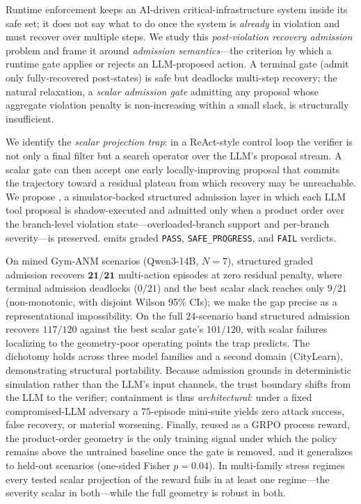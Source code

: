 Runtime enforcement keeps an AI-driven critical-infrastructure system inside its safe set; it does not say what to do once the system is \emph{already} in violation and must recover over multiple steps. We study this \emph{post-violation recovery admission} problem and frame it around \emph{admission semantics}---the criterion by which a runtime gate applies or rejects an LLM-proposed action. A terminal gate (admit only fully-recovered post-states) is safe but deadlocks multi-step recovery; the natural relaxation, a \emph{scalar admission gate} admitting any proposal whose aggregate violation penalty is non-increasing within a small slack, is structurally insufficient.

We identify the \emph{scalar projection trap}: in a ReAct-style control loop the verifier is not only a final filter but a search operator over the LLM's proposal stream. A scalar gate can then accept one early locally-improving proposal that commits the trajectory toward a residual plateau from which recovery may be unreachable. We propose \silr{}, a simulator-backed structured admission layer in which each LLM tool proposal is shadow-executed and admitted only when a product order over the branch-level violation state---overloaded-branch support and per-branch severity---is preserved. \silr{} emits graded \texttt{PASS}, \texttt{SAFE\_PROGRESS}, and \texttt{FAIL} verdicts.

On mined Gym-ANM scenarios (Qwen3-14B, $N{=}7$), structured graded admission recovers $\mathbf{21/21}$ multi-action episodes at zero residual penalty, where terminal admission deadlocks ($0/21$) and the best scalar slack reaches only $9/21$ (non-monotonic, with disjoint Wilson 95\% CIs); we make the gap precise as a representational impossibility. On the full $24$-scenario band structured admission recovers $117/120$ against the best scalar gate's $101/120$, with scalar failures localizing to the geometry-poor operating points the trap predicts. The dichotomy holds across three model families and a second domain (CityLearn), demonstrating structural portability. Because admission grounds in deterministic simulation rather than the LLM's input channels, the trust boundary shifts from the LLM to the verifier; containment is thus \emph{architectural}: under a fixed compromised-LLM adversary a $75$-episode mini-suite yields zero attack success, false recovery, or material worsening. Finally, reused as a GRPO process reward, the product-order geometry is the only training signal under which the policy remains above the untrained baseline once the gate is removed, and it generalizes to held-out scenarios (one-sided Fisher $p{=}0.04$). In multi-family stress regimes every tested scalar projection of the reward fails in at least one regime---the severity scalar in both---while the full geometry is robust in both.
